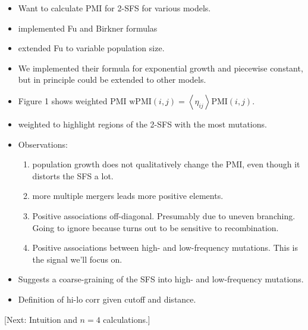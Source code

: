 \documentclass[11pt, letterpaper]{article}   	%
\newcommand{\E}[1]{\left< #1 \right>}
\begin{document}
\begin{itemize}
    \item Want to calculate PMI for 2-SFS for various models.
    \item implemented Fu and Birkner formulas
    \item \cite{ZivkovicWiehe2008} extended Fu to variable population size.
    \item We implemented their formula for exponential growth and piecewise constant, but in principle could be extended to other models.
    \item Figure 1 shows weighted PMI $\text{wPMI}(i,j) = \E{\eta_{ij}} \text{PMI}(i,j)$.
    \item weighted to highlight regions of the 2-SFS with the most mutations.
    \item Observations:
    \begin{enumerate}
        \item population growth does not qualitatively change the PMI, even though it distorts the SFS a lot.
        \item more multiple mergers leads more positive elements.
        \item Positive associations off-diagonal. Presumably due to uneven branching. Going to ignore because turns out to be sensitive to recombination.
        \item Positive associations between high- and low-frequency mutations. This is the signal we'll focus on.
    \end{enumerate}
    \item Suggests a coarse-graining of the SFS into high- and low-frequency mutations.
    \item Definition of hi-lo corr given cutoff and distance.
\end{itemize}

[Next: Intuition and $n=4$ calculations.]
\end{document}
